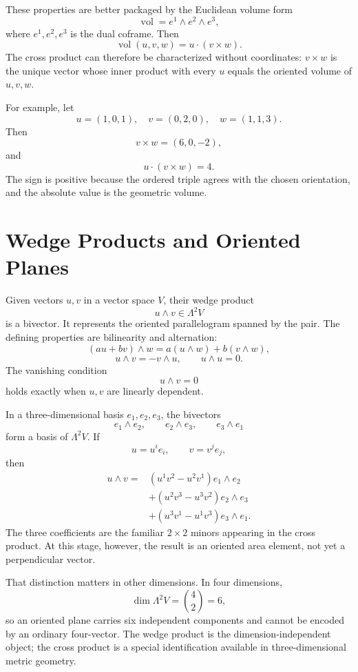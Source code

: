 These properties are better packaged by the Euclidean volume form
\[
  \operatorname{vol}=e^1\wedge e^2\wedge e^3,
\]
where \(e^1,e^2,e^3\) is the dual coframe.  Then
\[
  \operatorname{vol}(u,v,w)
  =u\cdot(v\times w).
\]
The cross product can therefore be characterized without coordinates: \(v\times w\) is the unique vector whose inner product with every \(u\) equals the oriented volume of \(u,v,w\).

For example, let
\[
  u=(1,0,1),
  \quad
  v=(0,2,0),
  \quad
  w=(1,1,3).
\]
Then
\[
  v\times w=(6,0,-2),
\]
and
\[
  u\cdot(v\times w)=4.
\]
The sign is positive because the ordered triple agrees with the chosen orientation, and the absolute value is the geometric volume.

\section{Wedge Products and Oriented Planes}

Given vectors \(u,v\) in a vector space \(V\), their wedge product
\[
  u\wedge v\in\Lambda^2V
\]
is a bivector.  It represents the oriented parallelogram spanned by the pair.  The defining properties are bilinearity and alternation:
\[
  (au+bv)\wedge w
  =a(u\wedge w)+b(v\wedge w),
\]
\[
  u\wedge v=-v\wedge u,
  \qquad
  u\wedge u=0.
\]
The vanishing condition
\[
  u\wedge v=0
\]
holds exactly when \(u,v\) are linearly dependent.

In a three-dimensional basis \(e_1,e_2,e_3\), the bivectors
\[
  e_1\wedge e_2,
  \qquad
  e_2\wedge e_3,
  \qquad
  e_3\wedge e_1
\]
form a basis of \(\Lambda^2V\).  If
\[
  u=u^ie_i,
  \qquad
  v=v^je_j,
\]
then
\[
\begin{aligned}
  u\wedge v={}&
  (u^1v^2-u^2v^1)e_1\wedge e_2\\
  &+(u^2v^3-u^3v^2)e_2\wedge e_3\\
  &+(u^3v^1-u^1v^3)e_3\wedge e_1.
\end{aligned}
\]
The three coefficients are the familiar \(2\times2\) minors appearing in the cross product.  At this stage, however, the result is an oriented area element, not yet a perpendicular vector.

That distinction matters in other dimensions.  In four dimensions,
\[
  \dim\Lambda^2V=\binom42=6,
\]
so an oriented plane carries six independent components and cannot be encoded by an ordinary four-vector.  The wedge product is the dimension-independent object; the cross product is a special identification available in three-dimensional metric geometry.

